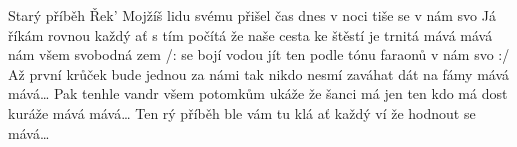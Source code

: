 \begin{TEXT}{Starý příběh}
\SLOKA Řek'  Mojžíš lidu svému přišel čas \NL
dnes v noci tiše  se   \NL
{}v nám  svo 
\SLOKA Já říkám rovnou každý ať s tím počítá \NL
že naše cesta ke štěstí je trnitá \NL
mává mává nám všem svobodná zem 
\REFREN  /:  se bojí vodou jít \NL
ten podle tónu faraonů   \NL
{}v nám  svo   :/
\SLOKA Až první krůček bude jednou za námi \NL
tak nikdo nesmí zaváhat dát na fámy \NL
mává mává… 
\SLOKA Pak tenhle vandr všem potomkům ukáže \NL
že šanci má jen ten kdo má dost kuráže \NL
mává mává… 
\REFRENHRAJ
\SLOKA Ten rý příběh ble vám tu klá \NL
ať každý ví že hodnout se   \NL
{} mává… 
\end{TEXT}
